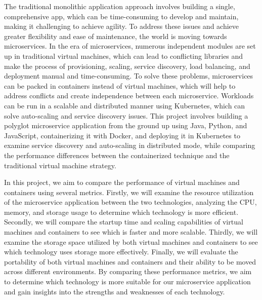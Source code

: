 The traditional monolithic application approach involves building a single, comprehensive app, which can be time-consuming to develop and maintain, making it challenging to achieve agility. To address these issues and achieve greater flexibility and ease of maintenance, the world is moving towards microservices. In the era of microservices, numerous independent modules are set up in traditional virtual machines, which can lead to conflicting libraries and make the process of provisioning, scaling, service discovery, load balancing, and deployment manual and time-consuming. To solve these problems, microservices can be packed in containers instead of virtual machines, which will help to address conflicts and create independence between each microservice. Workloads can be run in a scalable and distributed manner using Kubernetes, which can solve auto-scaling and service discovery issues. This project involves building a polyglot microservice application from the ground up using Java, Python, and JavaScript, containerizing it with Docker, and deploying it in Kubernetes to examine service discovery and auto-scaling in distributed mode, while comparing the performance differences between the containerized technique and the traditional virtual machine strategy.


In this project, we aim to compare the performance of virtual machines and containers using several metrics. Firstly, we will examine the resource utilization of the microservice application between the two technologies, analyzing the CPU, memory, and storage usage to determine which technology is more efficient. Secondly, we will compare the startup time and scaling capabilities of virtual machines and containers to see which is faster and more scalable. Thirdly, we will examine the storage space utilized by both virtual machines and containers to see which technology uses storage more effectively. Finally, we will evaluate the portability of both virtual machines and containers and their ability to be moved across different environments. By comparing these performance metrics, we aim to determine which technology is more suitable for our microservice application and gain insights into the strengths and weaknesses of each technology.


